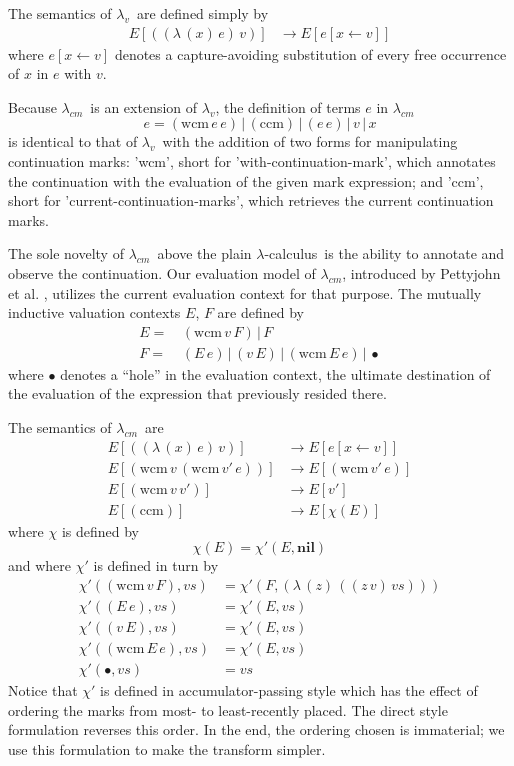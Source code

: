 \documentclass{llncs}
\newcommand{\cm}[0]{$\lambda_{cm}$}
\newcommand{\lv}[0]{$\lambda_v$}
\newcommand{\lc}[0]{$\lambda$-calculus}
\newcommand{\wcm}[2]{(\mathrm{wcm}\,#1\,#2)}
\newcommand{\ccm}[0]{(\mathrm{ccm})}
\newcommand{\app}[2]{(#1\,#2)}
\newcommand{\abs}[2]{(\lambda\,(#1)\,#2)}
\newcommand{\hole}[0]{\bullet}
\newcommand{\rr}[0]{\rightarrow}
\begin{document}
The semantics of \lv\ are defined simply by
\begin{align}
E[\app{\abs{x}{e}}{v}]  &\rr E[e[x\leftarrow v]]
\end{align}
where $e[x\leftarrow v]$ denotes a capture-avoiding substitution of every free occurrence of $x$ in $e$ with $v$.

Because \cm\ is an extension of \lv, the definition of terms $e$ in \cm\ 
\begin{equation}
e=\wcm{e}{e}\,|\,\ccm\,|\,\app{e}{e}\,|\,v\,|\,x
\end{equation}
is identical to that of \lv\ with the addition of two forms for manipulating continuation marks: \scheme'wcm', short for \scheme'with-continuation-mark', which annotates the continuation with the evaluation of the given mark expression; and \scheme'ccm', short for \scheme'current-continuation-marks', which retrieves the current continuation marks.

The sole novelty of \cm\ above the plain \lc\ is the ability to annotate and observe the continuation. Our evaluation model of \cm, introduced by Pettyjohn et al. \cite{pettyjohn2005continuations}, utilizes the current evaluation context for that purpose. The mutually inductive valuation contexts $E$, $F$ are defined by
\begin{align}
E=\, &\wcm{v}{F}\,|\,F\\
F=\, &\app{E}{e}\,|\,\app{v}{E}\,|\,\wcm{E}{e}\,|\,\hole
\end{align}
where $\hole$ denotes a ``hole'' in the evaluation context, the ultimate destination of the evaluation of the expression that previously resided there.

The semantics of \cm\ are
\begin{align}
E[\app{\abs{x}{e}}{v}]  &\rr E[e[x\leftarrow v]]\\
E[\wcm{v}{\wcm{v'}{e}}] &\rr E[\wcm{v'}{e}]\\
E[\wcm{v}{v'}]          &\rr E[v']\\
E[\ccm]                 &\rr E[\chi(E)]
\end{align}
where $\chi$ is defined by
\begin{equation}
\chi(E)=\chi'(E,\mathbf{nil})
\end{equation}
and where $\chi'$ is defined in turn by
\begin{align}
\chi'(\wcm{v}{F},vs) &= \chi'(F,\abs{z}{\app{\app{z}{v}}{vs}})\\
\chi'(\app{E}{e},vs) &= \chi'(E,vs)\\
\chi'(\app{v}{E},vs) &= \chi'(E,vs)\\
\chi'(\wcm{E}{e},vs) &= \chi'(E,vs)\\
\chi'(\hole,vs)      &= vs
\end{align}
Notice that $\chi'$ is defined in accumulator-passing style which has the effect of ordering the marks from most- to least-recently placed. The direct style formulation reverses this order. In the end, the ordering chosen is immaterial; we use this formulation to make the transform simpler.
\end{document}
